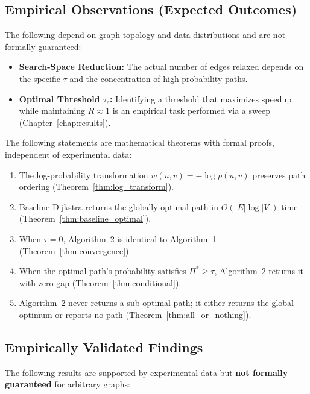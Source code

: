 \subsection{Empirical Observations (Expected Outcomes)}
The following depend on graph topology and data distributions and are not formally guaranteed:
\begin{itemize}
    \item \textbf{Search-Space Reduction:} The actual number of edges relaxed depends on the specific $\tau$ and the concentration of high-probability paths.
    \item \textbf{Optimal Threshold $\tau_c$:} Identifying a threshold that maximizes speedup while maintaining $R \approx 1$ is an empirical task performed via a sweep (Chapter~\ref{chap:results}).
\end{itemize}

The following statements are mathematical theorems with formal proofs, independent of experimental data:

\begin{enumerate}
\item[(T1)] The log-probability transformation $w(u,v) = -\log p(u,v)$ preserves path ordering (Theorem~\ref{thm:log_transform}).
\item[(T2)] Baseline Dijkstra returns the globally optimal path in $O(|E|\log|V|)$ time (Theorem~\ref{thm:baseline_optimal}).
\item[(T3)] When $\tau = 0$, Algorithm~2 is identical to Algorithm~1 (Theorem~\ref{thm:convergence}).
\item[(T4)] When the optimal path's probability satisfies $\Pi^* \geq \tau$, Algorithm~2 returns it with zero gap (Theorem~\ref{thm:conditional}).
\item[(T5)] Algorithm~2 never returns a sub-optimal path; it either returns the global optimum or reports no path (Theorem~\ref{thm:all_or_nothing}).
\end{enumerate}

\subsection{Empirically Validated Findings}

The following results are supported by experimental data but \textbf{not formally guaranteed} for arbitrary graphs:

